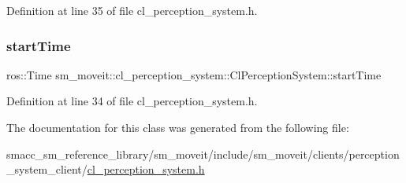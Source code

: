 Definition at line 35 of file cl\+\_\+perception\+\_\+system.\+h.

\mbox{\label{classsm__moveit_1_1cl__perception__system_1_1ClPerceptionSystem_a115fa9b61255bafa00931484f60d993a}} 
\subsubsection{\texorpdfstring{start\+Time}{startTime}}
{\footnotesize\ttfamily ros\+::\+Time sm\+\_\+moveit\+::cl\+\_\+perception\+\_\+system\+::\+Cl\+Perception\+System\+::start\+Time}



Definition at line 34 of file cl\+\_\+perception\+\_\+system.\+h.



The documentation for this class was generated from the following file\+:\begin{DoxyCompactItemize}
\item 
smacc\+\_\+sm\+\_\+reference\+\_\+library/sm\+\_\+moveit/include/sm\+\_\+moveit/clients/perception\+\_\+system\+\_\+client/\hyperlink{cl__perception__system_8h}{cl\+\_\+perception\+\_\+system.\+h}\end{DoxyCompactItemize}
